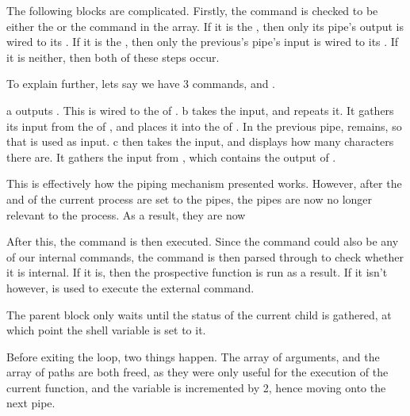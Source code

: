 \documentclass[12pt, a4paper]{report}
\begin{document}
                \clearpage


                \begingroup
                \fontsize{10pt}{10pt}\selectfont
                \endgroup

                The following blocks are complicated. Firstly, the command is checked
                to be either the  or the  command in the array.
                If it is the , then only its pipe's output is wired to its .
                If it is the , then only the previous's pipe's input is wired to its .
                If it is neither, then both of these steps occur.

                To explain further, lets say we have 3 commands,  and .

                a outputs . This is wired to the  of .
                b takes the input, and repeats it. It gathers its input from the  of ,
                and places it into the  of . In the previous pipe, 
                remains, so that is used as input. c then takes the input, and displays how many characters there
                are. It gathers the input from , which contains the output of .

                This is effectively how the piping mechanism presented works. However, after the
                 and  of the current process are set to the pipes, the pipes are
                now no longer relevant to the process. As a result, they are now 
                \clearpage

                After this, the command is then executed. Since the command could also be any
                of our internal commands, the command is then parsed through to check whether
                it is internal. If it is, then the prospective function is run as a result.
                If it isn't however,  is used to execute the external command.
                
                The parent block only waits until the status of the current child is gathered,
                at which point the  shell variable is set to it.

                Before exiting the loop, two things happen. The array of arguments, and the array
                of paths are both freed, as they were only useful for the execution of the current
                function, and the  variable is incremented by 2, hence moving onto the next pipe.
\end{document}
